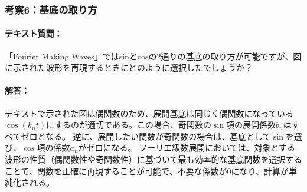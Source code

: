 \documentclass{article}
\begin{document}
\subsubsection{考察6：基底の取り方}
\begin{spacing}{1.2}
    \paragraph*{テキスト質問：}
    「Fourier Making Waves」ではsinとcosの2通りの基底の取り方が可能ですが、図に示された波形を再現するときにどのように選択したでしょうか？
    \paragraph*{解答：}
    テキストで示された図は偶関数のため、展開基底は同じく偶関数になっている$\cos(k_n t)$にするのが適切である。この場合、奇関数の$\sin$項の展開係数$b_n$はすべてゼロとなる。
    逆に、展開したい関数が奇関数の場合は、基底として$\sin$を選び、$\cos$項の係数$a_n$がゼロになる。
    フーリエ級数展開においては、対象とする波形の性質（偶関数性や奇関数性）に基づいて最も効率的な基底関数を選択することで、関数を正確に再現することが可能で、不要な係数が0になり、計算が単純化される。
\end{spacing}
\end{document}
